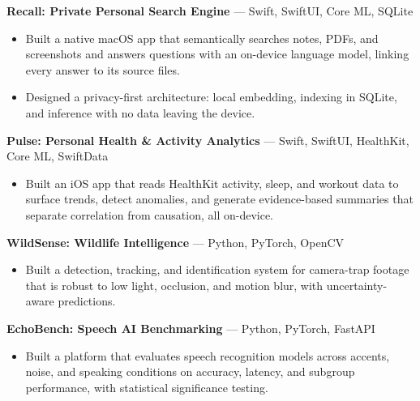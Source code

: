 \documentclass[a4paper,8pt]{extarticle}
\begin{document}
\noindent
\textbf{Recall: Private Personal Search Engine} --- Swift, SwiftUI, Core ML, SQLite

\begin{itemize}
\item Built a native macOS app that semantically searches notes, PDFs, and screenshots and answers questions with an on-device language model, linking every answer to its source files.
\item Designed a privacy-first architecture: local embedding, indexing in SQLite, and inference with no data leaving the device.
\end{itemize}

\noindent
\textbf{Pulse: Personal Health \& Activity Analytics} --- Swift, SwiftUI, HealthKit, Core ML, SwiftData

\begin{itemize}
\item Built an iOS app that reads HealthKit activity, sleep, and workout data to surface trends, detect anomalies, and generate evidence-based summaries that separate correlation from causation, all on-device.
\end{itemize}

\noindent
\textbf{WildSense: Wildlife Intelligence} --- Python, PyTorch, OpenCV

\begin{itemize}
\item Built a detection, tracking, and identification system for camera-trap footage that is robust to low light, occlusion, and motion blur, with uncertainty-aware predictions.
\end{itemize}

\noindent
\textbf{EchoBench: Speech AI Benchmarking} --- Python, PyTorch, FastAPI

\begin{itemize}
\item Built a platform that evaluates speech recognition models across accents, noise, and speaking conditions on accuracy, latency, and subgroup performance, with statistical significance testing.
\end{itemize}
\end{document}
